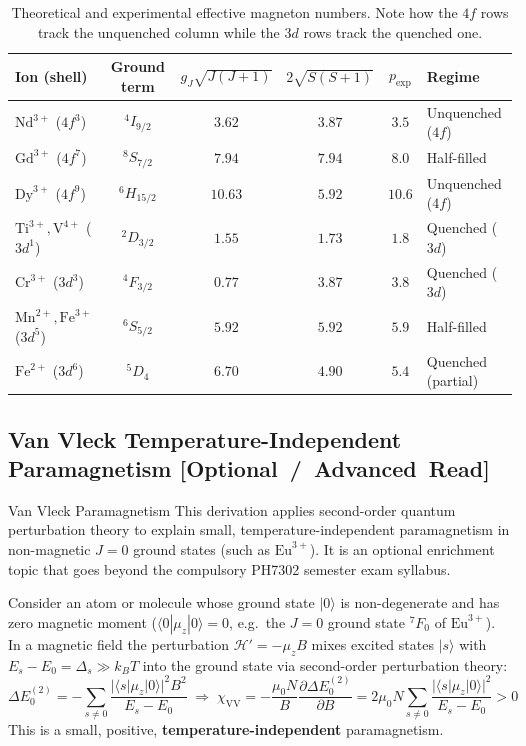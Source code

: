 \documentclass[11pt,a4paper]{article}
\newcommand{\extratag}{\hfill\mbox{\normalfont\footnotesize\sffamily\color{secondary}\textbf{[Optional / Advanced Read]}}}
\begin{document}
\begin{table}[htbp]
\centering
\caption{Theoretical and experimental effective magneton numbers. Note how the $4f$ rows track the unquenched column while the $3d$ rows track the quenched one.}
\label{tab:peff}

\small
\begin{tabular}{l c c c c L{3.1cm}}
\toprule
\textbf{Ion (shell)} & \textbf{Ground term} & $g_J\sqrt{J(J+1)}$ & $2\sqrt{S(S+1)}$ & $p_{\mathrm{exp}}$ & \textbf{Regime} \\
\midrule
$\text{Nd}^{3+}$ ($4f^3$) & $^4I_{9/2}$ & $3.62$ & $3.87$ & $3.5$ & Unquenched ($4f$) \\
$\text{Gd}^{3+}$ ($4f^7$) & $^8S_{7/2}$ & $7.94$ & $7.94$ & $8.0$ & Half-filled \\
$\text{Dy}^{3+}$ ($4f^9$) & $^6H_{15/2}$ & $10.63$ & $5.92$ & $10.6$ & Unquenched ($4f$) \\
\midrule
$\text{Ti}^{3+}, \text{V}^{4+}$ ($3d^1$) & $^2D_{3/2}$ & $1.55$ & $1.73$ & $1.8$ & Quenched ($3d$) \\
$\text{Cr}^{3+}$ ($3d^3$) & $^4F_{3/2}$ & $0.77$ & $3.87$ & $3.8$ & Quenched ($3d$) \\
$\text{Mn}^{2+}, \text{Fe}^{3+}$ ($3d^5$) & $^6S_{5/2}$ & $5.92$ & $5.92$ & $5.9$ & Half-filled \\
$\text{Fe}^{2+}$ ($3d^6$) & $^5D_4$ & $6.70$ & $4.90$ & $5.4$ & Quenched (partial) \\
\bottomrule
\end{tabular}
\end{table}

\subsection[Van Vleck Paramagnetism (Optional Read)]{Van Vleck Temperature-Independent Paramagnetism \extratag}
\label{sec:vanvleck}

\begin{enrichmentnote}{Van Vleck Paramagnetism}
This derivation applies second-order quantum perturbation theory to explain small, temperature-independent paramagnetism in non-magnetic $J = 0$ ground states (such as $\text{Eu}^{3+}$). It is an optional enrichment topic that goes beyond the compulsory PH7302 semester exam syllabus.
\end{enrichmentnote}

Consider an atom or molecule whose ground state $|0\rangle$ is non-degenerate and has zero magnetic moment ($\langle 0|\mu_z|0\rangle = 0$, e.g.\ the $J = 0$ ground state $^7F_0$ of $\text{Eu}^{3+}$). In a magnetic field the perturbation $\mathcal{H}' = -\mu_zB$ mixes excited states $|s\rangle$ with $E_s - E_0 = \Delta_s\gg k_BT$ into the ground state via second-order perturbation theory:
\begin{equation}
    \Delta E_0^{(2)} = -\sum_{s\neq 0}\frac{|\langle s|\mu_z|0\rangle|^2B^2}{E_s-E_0}
    \;\Longrightarrow\;
    \chi_{\mathrm{VV}} = -\frac{\mu_0N}{B}\frac{\partial\Delta E_0^{(2)}}{\partial B}
    = 2\mu_0N\sum_{s\neq0}\frac{|\langle s|\mu_z|0\rangle|^2}{E_s-E_0} > 0
    \label{eq:vanvleck}
\end{equation}
This is a small, positive, \textbf{temperature-independent} paramagnetism.
\end{document}
